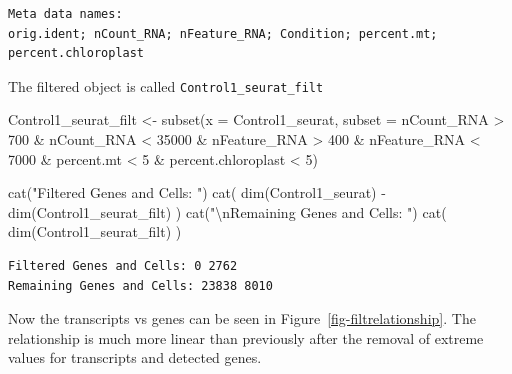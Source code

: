 \documentclass[
  letterpaper,
  DIV=11,
  numbers=noendperiod]{scrartcl}
\newenvironment{Shaded}{\begin{snugshade}}{\end{snugshade}}
\newcommand{\AttributeTok}[1]{\textcolor[rgb]{0.40,0.45,0.13}{#1}}
\newcommand{\DecValTok}[1]{\textcolor[rgb]{0.68,0.00,0.00}{#1}}
\newcommand{\FunctionTok}[1]{\textcolor[rgb]{0.28,0.35,0.67}{#1}}
\newcommand{\NormalTok}[1]{\textcolor[rgb]{0.00,0.23,0.31}{#1}}
\newcommand{\OtherTok}[1]{\textcolor[rgb]{0.00,0.23,0.31}{#1}}
\newcommand{\SpecialCharTok}[1]{\textcolor[rgb]{0.37,0.37,0.37}{#1}}
\newcommand{\StringTok}[1]{\textcolor[rgb]{0.13,0.47,0.30}{#1}}
\begin{document}
\begin{verbatim}
Meta data names:
orig.ident; nCount_RNA; nFeature_RNA; Condition; percent.mt; percent.chloroplast
\end{verbatim}

The filtered object is called \texttt{Control1\_seurat\_filt}

\begin{Shaded}
\begin{Highlighting}[]
\NormalTok{Control1\_seurat\_filt }\OtherTok{\textless{}{-}} \FunctionTok{subset}\NormalTok{(}\AttributeTok{x =}\NormalTok{ Control1\_seurat, }
                                        \AttributeTok{subset =}\NormalTok{ nCount\_RNA }\SpecialCharTok{\textgreater{}} \DecValTok{700} \SpecialCharTok{\&}
\NormalTok{                                                 nCount\_RNA }\SpecialCharTok{\textless{}} \DecValTok{35000} \SpecialCharTok{\&}
\NormalTok{                                                 nFeature\_RNA }\SpecialCharTok{\textgreater{}} \DecValTok{400} \SpecialCharTok{\&} 
\NormalTok{                                                 nFeature\_RNA }\SpecialCharTok{\textless{}} \DecValTok{7000} \SpecialCharTok{\&} 
\NormalTok{                                                 percent.mt }\SpecialCharTok{\textless{}} \DecValTok{5} \SpecialCharTok{\&} 
\NormalTok{                                                 percent.chloroplast }\SpecialCharTok{\textless{}} \DecValTok{5}\NormalTok{)}

\FunctionTok{cat}\NormalTok{(}\StringTok{"Filtered Genes and Cells: "}\NormalTok{)}
\FunctionTok{cat}\NormalTok{( }\FunctionTok{dim}\NormalTok{(Control1\_seurat) }\SpecialCharTok{{-}} \FunctionTok{dim}\NormalTok{(Control1\_seurat\_filt) )}
\FunctionTok{cat}\NormalTok{(}\StringTok{"}\SpecialCharTok{\textbackslash{}n}\StringTok{Remaining Genes and Cells: "}\NormalTok{)}
\FunctionTok{cat}\NormalTok{( }\FunctionTok{dim}\NormalTok{(Control1\_seurat\_filt) )}
\end{Highlighting}
\end{Shaded}

\begin{verbatim}
Filtered Genes and Cells: 0 2762
Remaining Genes and Cells: 23838 8010
\end{verbatim}

Now the transcripts vs genes can be seen in
Figure~\ref{fig-filtrelationship}. The relationship is much more linear
than previously after the removal of extreme values for transcripts and
detected genes.
\end{document}
